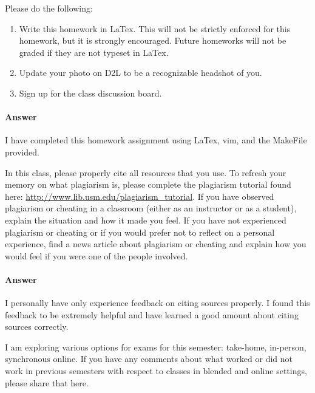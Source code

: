 \documentclass{article}
\begin{document}
Please do the following:
\begin{enumerate}
    \item Write this homework in LaTex. This will not be strictly enforced for
        this homework, but it is strongly encouraged.  Future homeworks will not
        be graded if they are not typeset in LaTex.
    \item Update your photo on D2L to be a recognizable headshot of you.
    \item Sign up for the class discussion board.
\end{enumerate}

\paragraph{Answer}


I have completed this homework assignment using LaTex, vim, and the MakeFile provided.



In this class, please properly cite all resources that you use.  To refresh your
memory on what plagiarism is, please complete the plagiarism tutorial found
here: \url{http://www.lib.usm.edu/plagiarism_tutorial}.  If you have observed
plagiarism or cheating in a classroom (either as an instructor or as a student),
explain the situation and how it made you feel.  If you have not experienced
plagiarism or cheating or if you would prefer not to reflect on a personal
experience, find a news article about plagiarism or cheating and explain how you
would feel if you were one of the people involved.

\paragraph{Answer} I personally have only experience feedback on citing sources properly. I found this feedback to be extremely helpful and have learned a good amount about citing sources correctly.


I am exploring various options for exams for this semester: take-home,
in-person, synchronous online.  If you have any comments about what worked or
did not work in previous semesters with respect to classes in blended and online
settings, please share that here.
\end{document}
